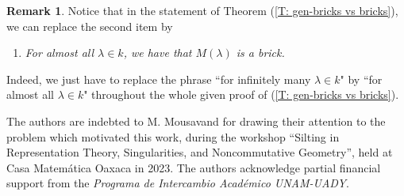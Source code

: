\documentclass{article}
\theoremstyle{definition}
\newtheorem{remark}[theorem]{Remark}
\begin{document}
\begin{remark} Notice that in the statement of Theorem (\ref{T: gen-bricks vs bricks}), we can replace the second item by
\begin{enumerate}
\item[\it 2'.] \emph{For almost all $\lambda\in k$, we have that $M(\lambda)$ is a brick.}
\end{enumerate}
Indeed, we just have to replace the phrase ``for infinitely many $\lambda\in k$" by ``for almost all $\lambda\in k$" throughout the whole given proof of (\ref{T: gen-bricks vs bricks}). 
\end{remark}

\medskip
{} The authors are indebted to M. Mousavand for drawing their  attention to the problem which motivated this work, during the workshop “Silting in Representation Theory, Singularities, and Noncommutative Geometry”,  held at Casa Matem\'atica  Oaxaca in  2023.
The authors acknowledge partial financial support from the \emph{Programa de Intercambio Acad\'emico UNAM-UADY}.  
\end{document}
